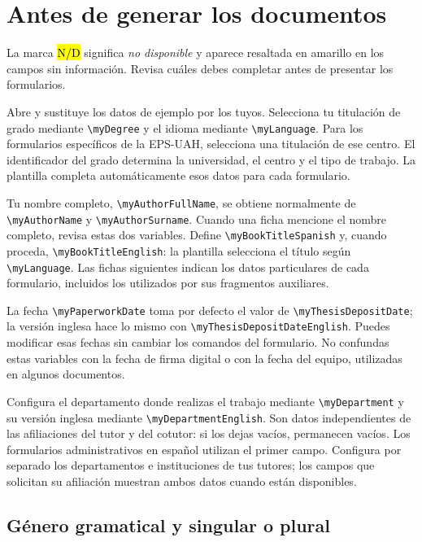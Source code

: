 \documentclass[10pt,a4paper]{article}
\newcommand{\variable}[1]{\texttt{\textbackslash{}}\nolinkurl{#1}}
\newcommand{\fichero}[1]{\path{#1}}
\begin{document}
\section{Antes de generar los documentos}

La marca \hl{N/D} significa \emph{no disponible} y aparece resaltada en amarillo en los campos sin información. Revisa cuáles debes completar antes de presentar los formularios.

Abre \fichero{Config/myconfig.tex} y sustituye los datos de ejemplo por los tuyos. Selecciona tu titulación de grado mediante \variable{myDegree} y el idioma mediante \variable{myLanguage}. Para los formularios específicos de la EPS-UAH, selecciona una titulación de ese centro. El identificador del grado determina la universidad, el centro y el tipo de trabajo. La plantilla completa automáticamente esos datos para cada formulario.

Tu nombre completo, \variable{myAuthorFullName}, se obtiene normalmente de \variable{myAuthorName} y \variable{myAuthorSurname}. Cuando una ficha mencione el nombre completo, revisa estas dos variables. Define \variable{myBookTitleSpanish} y, cuando proceda, \variable{myBookTitleEnglish}: la plantilla selecciona el título según \variable{myLanguage}. Las fichas siguientes indican los datos particulares de cada formulario, incluidos los utilizados por sus fragmentos auxiliares.

La fecha \variable{myPaperworkDate} toma por defecto el valor de \variable{myThesisDepositDate}; la versión inglesa hace lo mismo con \variable{myThesisDepositDateEnglish}. Puedes modificar esas fechas sin cambiar los comandos del formulario. No confundas estas variables con la fecha de firma digital o con la fecha del equipo, utilizadas en algunos documentos.

Configura el departamento donde realizas el trabajo mediante \variable{myDepartment} y su versión inglesa mediante \variable{myDepartmentEnglish}. Son datos independientes de las afiliaciones del tutor y del cotutor: si los dejas vacíos, permanecen vacíos. Los formularios administrativos en español utilizan el primer campo. Configura por separado los departamentos e instituciones de tus tutores; los campos que solicitan su afiliación muestran ambos datos cuando están disponibles.

\subsection{Género gramatical y singular o plural}
\end{document}
